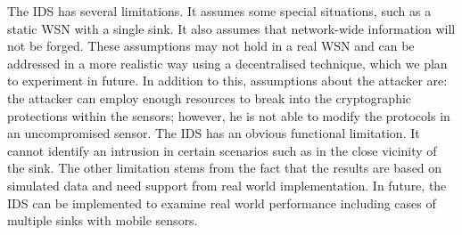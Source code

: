 \documentclass{CRPITStyle}
\begin{document}
The IDS has several limitations. 
It assumes some special situations, such as a static WSN with a single sink.
It also assumes that network-wide information will not be forged. %
These assumptions may not hold in a real WSN and can be addressed in a more realistic way using a decentralised technique, which we plan to experiment in future.
In addition to this, assumptions about the attacker are: the attacker can employ enough resources to break into the cryptographic protections within the sensors; however, he is not able to modify the protocols in an uncompromised sensor.
The IDS has an obvious functional limitation.
It cannot identify an intrusion in certain scenarios such as 
in the close vicinity of the sink.%
The other limitation stems from the fact that the results are based on simulated data and need support from real world implementation.
In future,  the IDS can be implemented to examine real world performance including cases of multiple sinks with mobile sensors.






\end{document}

